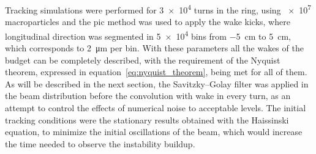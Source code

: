     Tracking simulations were performed for \num{3e4} turns in the ring, using \num{e7} macroparticles and the \gls{pic} method was used to apply the wake kicks, where longitudinal direction was segmented in \num{5e4} bins from \SI{-5}{\centi\meter} to \SI{5}{\centi\meter}, which corresponds to \SI{2}{\micro\meter} per bin. With these parameters all the wakes of the budget can be completely described, with the requirement of the Nyquist theorem, expressed in equation~\eqref{eq:nyquist_theorem}, being met for all of them. As will be described in the next section, the Savitzky--Golay filter was applied in the beam distribution before the convolution with wake in every turn, as an attempt to control the effects of numerical noise to acceptable levels. The initial tracking conditions were the stationary results obtained with the Haissinski equation, to minimize the initial oscillations of the beam, which would increase the time needed to observe the instability buildup.

